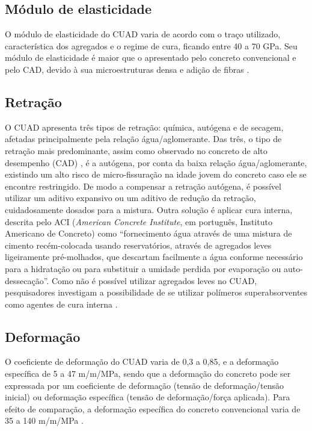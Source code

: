 \subsection{Módulo de elasticidade}

O módulo de elasticidade do CUAD varia de acordo com o traço utilizado, característica dos agregados e o regime de cura, ficando entre 40 a 70 GPa. Seu módulo de elasticidade é maior que o apresentado pelo concreto convencional e pelo CAD, devido à sua microestruturas densa e adição de fibras \cite[p.~591]{Gu}.

\subsection{Retração}

O CUAD apresenta três tipos de retração: química, autógena e de secagem, afetadas principalmente pela relação água/aglomerante. Das três, o tipo de retração mais predominante, assim como observado no concreto de alto desempenho (CAD) \cite[p.~408]{Neville2}, é a autógena, por conta da baixa relação água/aglomerante, existindo um alto risco de micro-fissuração na idade jovem do concreto caso ele se encontre restringido. De modo a compensar a retração autógena, é possível utilizar um aditivo expansivo ou um aditivo de redução da retração, cuidadosamente dosados para a mistura. Outra solução é aplicar cura interna, descrita pelo ACI (\textit{American Concrete Institute}, em português, Instituto Americano de Concreto) como ``fornecimento água através de uma mistura de cimento recém-colocada usando reservatórios, através de agregados leves ligeiramente pré-molhados, que descartam facilmente a água conforme necessário para a hidratação ou para substituir a umidade perdida por evaporação ou auto-dessecação''. Como não é possível utilizar agregados leves no CUAD, pesquisadores investigam a possibilidade de se utilizar polímeros superabsorventes como agentes de cura interna \cite[p.~592]{Gu}.


\subsection{Deformação}

O coeficiente de deformação do CUAD varia de 0,3 a 0,85, e a deformação específica de 5 a 47 {\textmu}m/m/MPa, sendo que a deformação do concreto pode ser expressada por um coeficiente de deformação (tensão de deformação/tensão inicial) ou deformação específica (tensão de deformação/força aplicada). Para efeito de comparação, a deformação específica do concreto convencional varia de 35 a 140 {\textmu}m/m/MPa \cite[p.~592]{Gu}.

